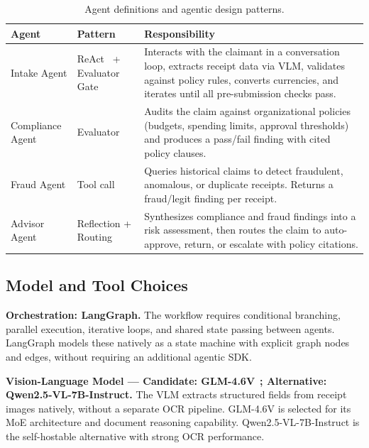 \documentclass{article}
\begin{document}
\begin{table}[h]
  \centering
  \caption{Agent definitions and agentic design patterns.}
  \label{tab:agents}
  \small
  \begin{tabularx}{\textwidth}{@{}>{\raggedright\arraybackslash}p{1.5cm} >{\raggedright\arraybackslash}p{1.7cm} X@{}}
    \toprule
    \textbf{Agent} & \textbf{Pattern} & \textbf{Responsibility} \\
    \midrule
    Intake Agent & ReAct~\cite{yao2023react} + Evaluator Gate & Interacts with the claimant in a conversation loop, extracts receipt data via VLM, validates against policy rules, converts currencies, and iterates until all pre-submission checks pass. \\
    \addlinespace
    Compliance Agent & Evaluator & Audits the claim against organizational policies (budgets, spending limits, approval thresholds) and produces a pass/fail finding with cited policy clauses. \\
    \addlinespace
    Fraud Agent & Tool call & Queries historical claims to detect fraudulent, anomalous, or duplicate receipts. Returns a fraud/legit finding per receipt. \\
    \addlinespace
    Advisor Agent & Reflection + Routing & Synthesizes compliance and fraud findings into a risk assessment, then routes the claim to auto-approve, return, or escalate with policy citations. \\
    \bottomrule
  \end{tabularx}
\end{table}

\subsection{Model and Tool Choices}
\label{sec:model-tools}

\textbf{Orchestration: LangGraph.}
The workflow requires conditional branching, parallel execution, iterative loops, and shared state passing between agents. LangGraph models these natively as a state machine with explicit graph nodes and edges, without requiring an additional agentic SDK.

\textbf{Vision-Language Model --- Candidate: GLM-4.6V}~\cite{glmv2025}\textbf{; Alternative: Qwen2.5-VL-7B-Instruct.}
The VLM extracts structured fields from receipt images natively, without a separate OCR pipeline. GLM-4.6V is selected for its MoE architecture and document reasoning capability. Qwen2.5-VL-7B-Instruct is the self-hostable alternative with strong OCR performance.
\end{document}
